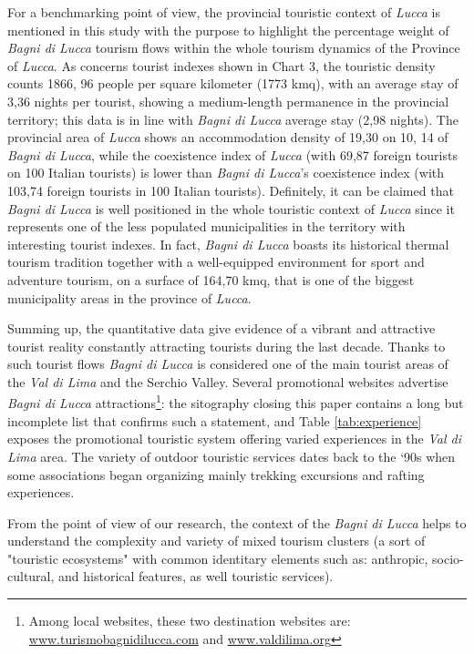 \documentclass[sustainability,article,submit,pdftex,moreauthors]{Definitions/mdpi}
\begin{document}
For a benchmarking point of view, the provincial touristic context of \emph{Lucca} is mentioned in this study with the purpose to highlight the percentage weight of \emph{Bagni di Lucca} tourism flows within the whole tourism dynamics of the Province of \emph{Lucca}. 
As concerns tourist indexes shown in Chart 3, the touristic density counts 1866, 96 people per square kilometer (1773 kmq), with an average stay of 3,36 nights per tourist, showing a medium-length permanence in the provincial territory; this data is in line with \emph{Bagni di Lucca} average stay (2,98 nights). 
The provincial area of \emph{Lucca} shows an accommodation density of 19,30 on 10, 14 of \emph{Bagni di Lucca}, while the coexistence index of \emph{Lucca} (with 69,87 foreign tourists on 100 Italian tourists) is lower than \emph{Bagni di Lucca}’s coexistence index (with 103,74 foreign tourists in 100 Italian tourists). 
Definitely, it can be claimed that \emph{Bagni di Lucca} is well positioned in the whole touristic context of \emph{Lucca} since it represents one of the less populated municipalities in the territory with interesting tourist indexes. In fact, \emph{Bagni di Lucca} boasts its historical thermal tourism tradition together with a well-equipped environment for sport and adventure tourism, on a surface of 164,70 kmq, that is one of the biggest municipality areas in the province of \emph{Lucca}.

Summing up, the quantitative data give evidence of a vibrant and attractive tourist reality constantly attracting tourists during the last decade. Thanks to such tourist flows \emph{Bagni di Lucca} is considered one of the main tourist areas of the \emph{Val di Lima} and the Serchio Valley. Several promotional websites advertise \emph{Bagni di Lucca} attractions\footnote{Among local websites, these two destination websites are: \url{www.turismobagnidilucca.com} and \url{www.valdilima.org}}: the sitography closing this paper contains a long but incomplete list that confirms such a statement, and Table \ref{tab:experience} exposes the promotional touristic system offering varied experiences in the \emph{Val di Lima} area. The variety of outdoor touristic services dates back to the ‘90s when some associations began organizing mainly trekking excursions and rafting experiences.

From the point of view of our research, the context of the \emph{Bagni di Lucca} helps to understand the complexity and variety of mixed tourism clusters (a sort of "touristic ecosystems" with common identitary elements such as: anthropic, socio-cultural, and historical features, as well touristic services).
\end{document}
